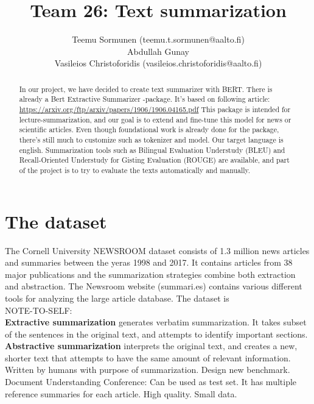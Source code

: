 \documentclass{article}
\title{Team 26: Text summarization}
\author{Teemu Sormunen (teemu.t.sormunen@aalto.fi)\\
	Abdullah Gunay\\
	Vasileios Christoforidis (vasileios.christoforidis@aalto.fi)\\
}
\begin{document}
	
\maketitle

\begin{abstract}
\noindent
	In our project, we have decided to create text summarizer with BERT. 
	There is already a Bert Extractive Summarizer -package. It's based on following article: \href{https://arxiv.org/ftp/arxiv/papers/1906/1906.04165.pdf}{https://arxiv.org/ftp/arxiv/papers/1906/1906.04165.pdf}
	This package is intended for lecture-summarization, and our goal is to extend and fine-tune this model for news or scientific articles.
	Even though foundational work is already done for the package, there's still much to customize such as tokenizer and model. 
	Our target language is english. Summarization tools such as Bilingual Evaluation Understudy (BLEU) and Recall-Oriented Understudy for Gisting Evaluation (ROUGE) are available, and part of the project is to try to evaluate the texts automatically and manually.	
\end{abstract}

\clearpage
\section{The dataset}

The Cornell University NEWSROOM dataset \cite{dataset} consists of 1.3 million news articles and summaries between the yeras 1998 and 2017. It contains articles from 38 major publications and the summarization strategies combine both extraction and abstraction. The Newsroom website (summari.es) contains various different tools for analyzing the large article database. The dataset is \\

\noindent
NOTE-TO-SELF: \\
\textbf{Extractive summarization} generates verbatim summarization. It takes subset of the sentences in the original text, and attempts to identify important sections. \cite{dataset}\\
\textbf{Abstractive summarization} interprets the original text, and creates a new, shorter text that attempts to have the same amount of relevant information.\\

Written by humans with purpose of summarization.
Design new benchmark. \\

Document Understanding Conference: Can be used as test set. It has multiple reference summaries for each article. High quality.
Small data. 
\end{document}
